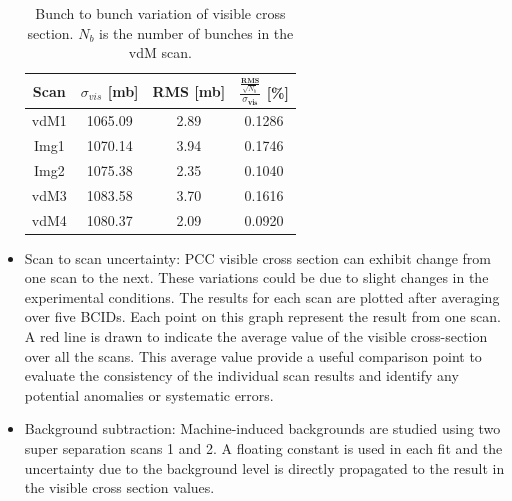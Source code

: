 \begin{itemize}
\begin{table}[!htp]
  \centering
  \caption{Bunch to bunch variation of visible cross section. $N_b$ is the number of bunches in the vdM scan.}
\begin{tabular}{cccc}
\textbf{Scan} & \textbf{$\sigma_{vis}$ [mb]} & \textbf{RMS [mb]} & $\frac{\frac{\textbf{RMS}}{\sqrt{N_b}}}{\sigma_{\textbf{vis}}}$ [\%] \\
\hline
vdM1 & 1065.09 & 2.89 & 0.1286 \\
Img1 & 1070.14 & 3.94 & 0.1746 \\
Img2 & 1075.38 & 2.35 & 0.1040 \\
vdM3 & 1083.58 & 3.70 & 0.1616 \\
vdM4 & 1080.37 & 2.09 & 0.0920 \\
\end{tabular}
\label{tab:my_label}
\end{table}


\newpage
\item Scan to scan uncertainty: PCC visible cross section can exhibit change from one scan to the next. These variations could be due to slight changes in the experimental conditions. The results for each scan are plotted after averaging over five BCIDs. Each point on this graph represent the result from one scan. A red line is drawn to indicate the average value of the visible cross-section over all the scans. This average value provide a useful comparison point to evaluate the consistency of the individual scan results and identify any potential anomalies or systematic errors.



\item Background subtraction: %
  Machine-induced backgrounds are studied using two super separation scans 1 and 2. A floating constant is used in each fit and the uncertainty due to the background level is directly propagated to the result in the visible cross section values.


\end{itemize}
